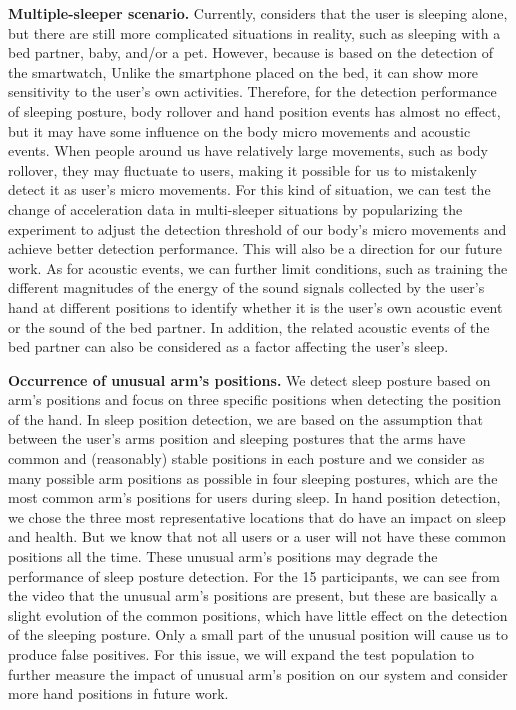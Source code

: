 \textbf{Multiple-sleeper scenario.} Currently, {\systemname} considers that the user is sleeping alone, but there are still more complicated situations in reality, such as sleeping with a bed partner, baby, and/or a pet. However, because {\systemname} is based on the detection of the smartwatch, Unlike the smartphone placed on the bed, it can show more sensitivity to the user's own activities. Therefore, for the detection performance of sleeping posture, body rollover and hand position events has almost no effect, but it may have some influence on the body micro movements and acoustic events. When people around us have relatively large movements, such as body rollover, they may fluctuate to users, making it possible for us to mistakenly detect it as user's micro movements. For this kind of situation, we can test the change of acceleration data in multi-sleeper situations by popularizing the experiment to adjust the detection threshold of our body's micro movements and achieve better detection performance. This will also be a direction for our future work. As for acoustic events, we can further limit conditions, such as training the different magnitudes of the energy of the sound signals collected by the user's hand at different positions to identify whether it is the user's own acoustic event or the sound of the bed partner. In addition, the related acoustic events of the bed partner can also be considered as a factor affecting the user's sleep.

\textbf{Occurrence of unusual arm's positions.} We detect sleep posture based on arm's positions and focus on three specific positions when detecting the position of the hand. In sleep position detection, we are based on the assumption that between the user's arms position and sleeping postures that the arms have common and (reasonably) stable positions in each posture and we consider as many possible arm positions as possible in four sleeping postures, which are the most common arm's positions for users during sleep. In hand position detection, we chose the three most representative locations that do have an impact on sleep and health. But we know that not all users or a user will not have these common positions all the time. These unusual arm's positions may degrade the performance of sleep posture detection. For the 15 participants, we can see from the video that the unusual arm's positions are present, but these are basically a slight evolution of the common positions, which have little effect on the detection of the sleeping posture. Only a small part of the unusual position will cause us to produce false positives. For this issue, we will expand the test population to further measure the impact of unusual arm's position on our system and consider more hand positions in future work.

